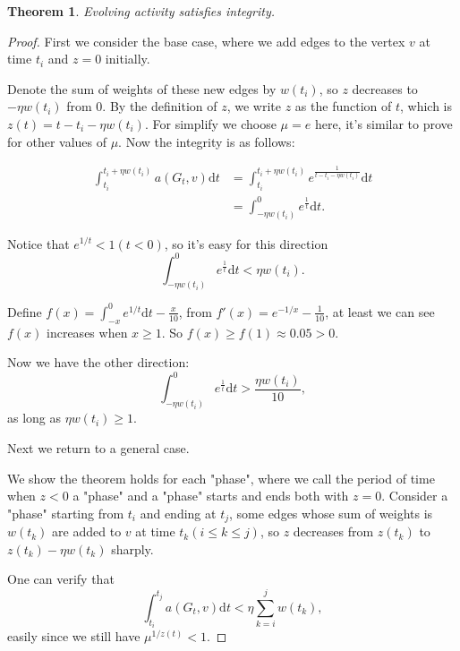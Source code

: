 \documentclass[12pt,abstract=true]{scrartcl}
\numberwithin{equation}{section}
\theoremstyle{definition}   \newtheorem{definition}{Definition}[section]
\theoremstyle{plain}        \newtheorem{theorem}{Theorem}[section]
\theoremstyle{plain}        \newtheorem{observation}{Observation}[section]
\theoremstyle{plain}        \newtheorem{fact}{Fact}[section]
\theoremstyle{plain}        \newtheorem{claim}{Claim}[section]
\theoremstyle{plain}        \newtheorem{lemma}[theorem]{Lemma}
\theoremstyle{plain}        \newtheorem{corollary}[theorem]{Corollary}
\theoremstyle{remark}       \newtheorem{example}{Example}[section]
\theoremstyle{remark}       \newtheorem{remark}{Remark}[section]
\begin{document}
\begin{theorem}
Evolving activity satisfies integrity.
\end{theorem}
\begin{proof}
First we consider the base case, where we add edges to the vertex $v$ at time $t_i$ and $z=0$ initially. 

Denote the sum of weights of these new edges by $w(t_i)$, so $z$ decreases to $-\eta w(t_i)$ from 0. By the definition of $z$, we write $z$ as the function of $t$, which is $z(t)=t-t_i-\eta w(t_i)$. For simplify we choose $\mu=e$ here, it's similar to prove for other values of $\mu$. Now the integrity is as follows:

\begin{equation}
\begin{split}
\int_{t_i}^{t_i+\eta w(t_i)} a(G_t,v) \mathrm{d}t &= \int_{t_i}^{t_i+\eta
w(t_i)} e^{\frac{1}{t-t_i-\eta w(t_i)}} \mathrm{d}t \\
&= \int_{-\eta w(t_i)}^{0} e^{\frac{1}{t}} \mathrm{d}t.
\end{split}
\end{equation}

Notice that $e^{1/t}<1(t<0)$, so it's easy for this direction
\begin{equation}
\int_{-\eta w(t_i)}^{0} e^{\frac{1}{t}} \mathrm{d}t< \eta w(t_i).
\end{equation}

Define $f(x)=\int_{-x}^{0} e^{1/t} \mathrm{d}t - \frac{x}{10}$, from $f'(x)=e^{-1/x}-\frac{1}{10}$, at least we can see $f(x)$ increases when $x\ge 1$. So $f(x)\ge f(1)\approx 0.05>0$.

Now we have the other direction: 
\begin{equation}
\int_{-\eta w(t_i)}^{0} e^{\frac{1}{t}} \mathrm{d}t>\frac{\eta w(t_i)}{10},
\end{equation}
as long as $\eta w(t_i)\ge 1$.

Next we return to a general case. 

We show the theorem holds for each "phase", where we call the period of time when $z<0$ a "phase" and a "phase" starts and ends both with $z=0$. Consider a "phase" starting from $t_i$ and ending at $t_j$, some edges whose sum of weights is $w(t_k)$ are added to $v$ at time $t_k(i\le k\le j)$, so $z$ decreases from $z(t_k)$ to $z(t_k)-\eta w(t_k)$ sharply.

One can verify that
\begin{equation}
\int_{t_i}^{t_j} a(G_t,v) \mathrm{d}t< \eta \sum_{k=i}^j w(t_k),
\end{equation}
easily since we still have $\mu^{1/z(t)}<1$.


\end{proof}
\end{document}
